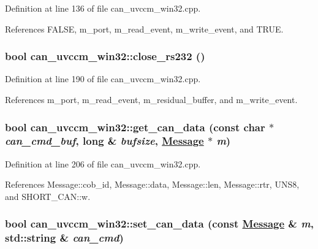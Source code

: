 Definition at line 136 of file can\_\-uvccm\_\-win32.cpp.

References FALSE, m\_\-port, m\_\-read\_\-event, m\_\-write\_\-event, and TRUE.\hypertarget{classcan__uvccm__win32_06f9d2fb860a821436471c3233f91dff}{
\subsubsection[close\_\-rs232]{\setlength{\rightskip}{0pt plus 5cm}bool can\_\-uvccm\_\-win32::close\_\-rs232 ()}}
\label{classcan__uvccm__win32_06f9d2fb860a821436471c3233f91dff}




Definition at line 190 of file can\_\-uvccm\_\-win32.cpp.

References m\_\-port, m\_\-read\_\-event, m\_\-residual\_\-buffer, and m\_\-write\_\-event.\hypertarget{classcan__uvccm__win32_c3d1d02a46518b2639beb6060f79f2a2}{
\subsubsection[get\_\-can\_\-data]{\setlength{\rightskip}{0pt plus 5cm}bool can\_\-uvccm\_\-win32::get\_\-can\_\-data (const char $\ast$ {\em can\_\-cmd\_\-buf}, long \& {\em bufsize}, \hyperlink{structMessage}{Message} $\ast$ {\em m})}}
\label{classcan__uvccm__win32_c3d1d02a46518b2639beb6060f79f2a2}




Definition at line 206 of file can\_\-uvccm\_\-win32.cpp.

References Message::cob\_\-id, Message::data, Message::len, Message::rtr, UNS8, and SHORT\_\-CAN::w.\hypertarget{classcan__uvccm__win32_0f2aed9c45f29e6082f37ea17aea46ae}{
\subsubsection[set\_\-can\_\-data]{\setlength{\rightskip}{0pt plus 5cm}bool can\_\-uvccm\_\-win32::set\_\-can\_\-data (const \hyperlink{structMessage}{Message} \& {\em m}, std::string \& {\em can\_\-cmd})}}
\label{classcan__uvccm__win32_0f2aed9c45f29e6082f37ea17aea46ae}




